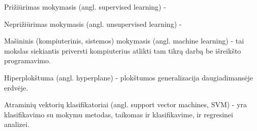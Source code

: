 Prižiūrimas mokymasis (angl. supervised learning) - %

Neprižiūrimas mokymasis (angl. unsupervised learning) - %

Mašininis\cite{mamcenko08} (kompiuterinis, sistemos\cite{martisiute08})
mokymasis (angl. machine learning) - tai mokslas siekiantis priversti
kompiuterius atlikti tam tikrą darbą be išreikšto programavimo.
\begin{comment}
Machine learning is the science of getting computers to act without being
explicitly programmed.
\end{comment}

Hiperplokštuma (angl. hyperplane) - plokštumos generalizacija daugiadimansėje
erdvėje.

Atraminių vektorių klasifikatoriai (angl. support vector machines, SVM) - yra
klasifikavimo su mokymu metodas, taikomas ir klasifikavime, ir regresinei
analizei.\cite{bernataviciene08}
